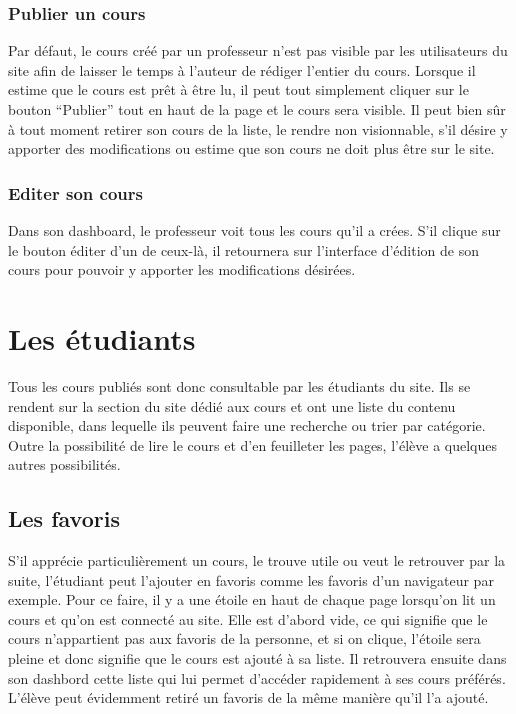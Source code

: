 \documentclass[letterpaper,10pt,english]{sphinxmanual}
\begin{document}
\subsubsection{Publier un cours}
\label{functionalities:publier-un-cours}
Par défaut, le cours créé par un professeur n'est pas visible par les utilisateurs du site afin de laisser le temps à l'auteur de rédiger l'entier du cours. Lorsque il estime que le cours est prêt à être lu, il peut tout simplement cliquer sur le bouton ``Publier'' tout en haut de la page et le cours sera visible. Il peut bien sûr à tout moment retirer son cours de la liste, le rendre non visionnable, s'il désire y apporter des modifications ou estime que son cours ne doit plus être sur le site.


\subsubsection{Editer son cours}
\label{functionalities:editer-son-cours}
Dans son dashboard, le professeur voit tous les cours qu'il a crées. S'il clique sur le bouton éditer d'un de ceux-là, il retournera sur l'interface d'édition de son cours pour pouvoir y apporter les modifications désirées.


\section{Les étudiants}
\label{functionalities:les-etudiants}
Tous les cours publiés sont donc consultable par les étudiants du site. Ils se rendent sur la section du site dédié aux cours et ont une liste du contenu disponible, dans lequelle ils peuvent faire une recherche ou trier par catégorie. Outre la possibilité de lire le cours et d'en feuilleter les pages, l'élève a quelques autres possibilités.


\subsection{Les favoris}
\label{functionalities:les-favoris}
S'il apprécie particulièrement un cours, le trouve utile ou veut le retrouver par la suite, l'étudiant peut l'ajouter en favoris comme les favoris d'un navigateur par exemple. Pour ce faire, il y a une étoile en haut de chaque page lorsqu'on lit un cours et qu'on est connecté au site. Elle est d'abord vide, ce qui signifie que le cours n'appartient pas aux favoris de la personne, et si on clique, l'étoile sera pleine et donc signifie que le cours est ajouté à sa liste. Il retrouvera ensuite dans son dashbord cette liste qui lui permet d'accéder rapidement à ses cours préférés. L'élève peut évidemment retiré un favoris de la même manière qu'il l'a ajouté.
\end{document}
